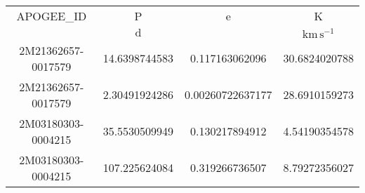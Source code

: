\begin{table}
\begin{tabular}{cccc}
APOGEE_ID & P & e & K \\
 & $\mathrm{d}$ &  & $\mathrm{km\,s^{-1}}$ \\
2M21362657-0017579 & 14.6398744583 & 0.117163062096   & 30.6824020788 \\
2M21362657-0017579 & 2.30491924286 & 0.00260722637177 & 28.6910159273 \\
2M03180303-0004215 & 35.5530509949 & 0.130217894912   & 4.54190354578 \\
2M03180303-0004215 & 107.225624084 & 0.319266736507   & 8.79272356027 \\
\end{tabular}
\end{table}
